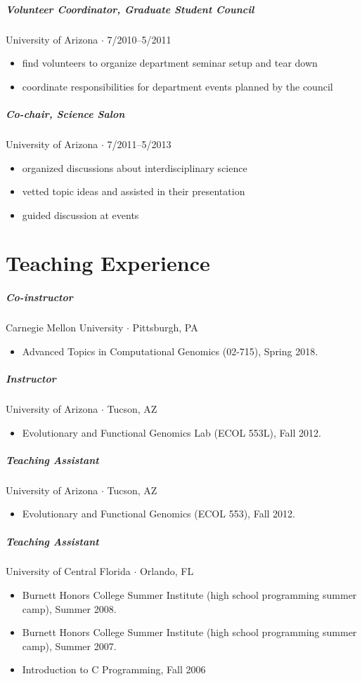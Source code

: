\documentclass[10pt,letterpaper]{article}
\begin{document}
\subparagraph{Volunteer Coordinator, Graduate Student Council}
University of Arizona $\cdot$ 7/2010--5/2011
\begin{itemize}
    \item find volunteers to organize department seminar setup and tear down
    \item coordinate responsibilities for department events planned by the council
\end{itemize}

\subparagraph{Co-chair, Science Salon}
University of Arizona $\cdot$ 7/2011--5/2013
\begin{itemize}
    \item organized discussions about interdisciplinary science
    \item vetted topic ideas and assisted in their presentation
    \item guided discussion at events
\end{itemize}




\section*{Teaching Experience}

\subparagraph{Co-instructor}  Carnegie Mellon University $\cdot$ Pittsburgh, PA
\begin{itemize}
    \item Advanced Topics in Computational Genomics (02-715), Spring 2018.
\end{itemize}

\subparagraph{Instructor} University of Arizona $\cdot$ Tucson, AZ
\begin{itemize}
    \item Evolutionary and Functional Genomics Lab (ECOL 553L), Fall 2012.
\end{itemize}

\subparagraph{Teaching Assistant}
University of Arizona $\cdot$ Tucson, AZ
\begin{itemize}
    \item Evolutionary and Functional Genomics (ECOL 553), Fall 2012.
\end{itemize}

\subparagraph{Teaching Assistant}
University of Central Florida $\cdot$ Orlando, FL
\begin{itemize}
    \item Burnett Honors College Summer Institute (high school programming summer camp), Summer 2008.
    \item Burnett Honors College Summer Institute (high school programming summer camp), Summer 2007.
    \item Introduction to C Programming, Fall 2006
\end{itemize}
\end{document}
